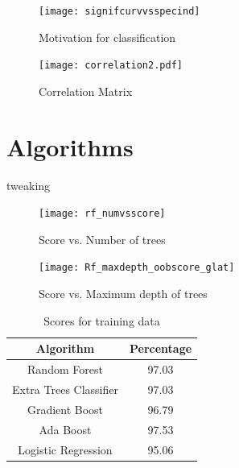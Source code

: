 \documentclass{beamer}
\begin{document}
\begin{frame}{}
\begin{figure}[!h]
    \centering
    \texttt{[image: signifcurvvsspecind]}
    \caption{Motivation for classification}
    \label{fig:mot}
\end{figure}
\end{frame}

\begin{frame}{}
\begin{figure}[!h]
    \centering
    \texttt{[image: correlation2.pdf]}
    \caption{Correlation Matrix}
    \label{fig:corr}
\end{figure}
\end{frame}


\section{Algorithms}
\begin{frame}{tweaking}
\begin{figure}[!h]
    \centering
    \texttt{[image: rf\_numvsscore]}
    \caption{Score vs. Number of trees}
    \label{fig:mot}
\end{figure}
\end{frame}
\begin{frame}{}
\begin{figure}[!h]
    \centering
    \texttt{[image: Rf\_maxdepth\_oobscore\_glat]}
    \caption{Score vs. Maximum depth of trees}
    \label{fig:mot}
\end{figure}
\end{frame}
\begin{frame}
\begin{table}[!h]
    \centering
    
    \begin{tabular}{|c|c|}
    \hline
    Algorithm&Percentage\\
     \hline
    Random Forest & 97.03\\
    \hline %
    Extra Trees Classifier& 97.03 \\
    \hline
    Gradient Boost & 96.79\\
    \hline %
    Ada Boost& 97.53 \\
    \hline %
    Logistic Regression& 95.06 \\
    \hline
     
    \end{tabular}

    \caption{Scores for training data}
    \label{tab:my_label}
\end{table}{}
\end{frame}
\end{document}
